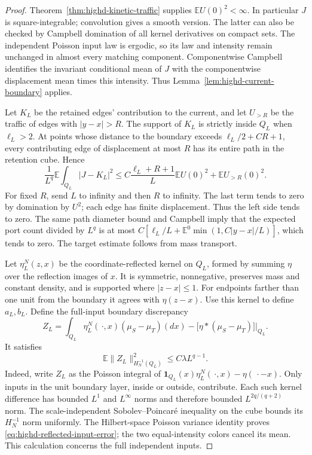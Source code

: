 \documentclass[11pt,reqno]{amsart}
\theoremstyle{definition}
\theoremstyle{remark}
\numberwithin{equation}{section}
\newcommand{\E}{\mathbb E}
\begin{document}
\begin{proof}
Theorem~\ref{thm:highd-kinetic-traffic} supplies \(\E U(0)^2<\infty\).
In particular \(J\) is square-integrable; convolution gives a smooth
version. The latter can also be checked by Campbell domination of all
kernel derivatives on compact sets. The independent Poisson input law
is ergodic, so its law and intensity remain unchanged in almost every
matching component. Componentwise Campbell identifies the invariant
conditional mean of \(J\) with the componentwise displacement mean
times this intensity. Thus Lemma~\ref{lem:highd-current-boundary} applies.

Let \(K_L\) be the retained edges' contribution to the current, and
let \(U_{>R}\) be the traffic of edges with \(|y-x|>R\).
The support of \(K_L\) is strictly inside \(Q_L\) when \(\ell_L>2\).
At points whose distance to the boundary exceeds
\(\ell_L/2+CR+1\), every contributing edge of displacement at most
\(R\) has its entire path in the retention cube. Hence
\begin{equation}
\label{eq:highd-bulk-current-error}
 \frac1{L^q}\E\int_{Q_L}|J-K_L|^2
 \le C\frac{\ell_L+R+1}{L}\E U(0)^2+\E U_{>R}(0)^2.
\end{equation}
For fixed \(R\), send \(L\) to infinity and then \(R\) to infinity.
The last term tends to zero by domination by \(U^2\); each edge has
finite displacement. Thus the left side tends to zero. The same path
diameter bound and Campbell imply that the expected port count divided
by \(L^q\) is at most
\(C[\ell_L/L+\E^0\min(1,C|y-x|/L)]\), which tends to zero.
The target estimate follows from mass transport.

Let \(\eta_L^N(z,x)\) be the coordinate-reflected kernel on \(Q_L\),
formed by summing \(\eta\) over the reflection images of \(x\).
It is symmetric, nonnegative, preserves mass and constant density, and
is supported where \(|z-x|\le1\). For endpoints farther than one
unit from the boundary it agrees with \(\eta(z-x)\). Use this kernel
to define \(a_L,b_L\). Define the full-input boundary discrepancy
\[
 Z_L=\int_{Q_L}\eta_L^N(\,\cdot,x)(\mu_S-\mu_T)(dx)
       -\bigl[\eta*(\mu_S-\mu_T)\bigr]\big|_{Q_L}.
\]
It satisfies
\begin{equation}
\label{eq:highd-reflected-input-error}
 \E\|Z_L\|_{H_N^{-1}(Q_L)}^2\le C\lambda L^{q-1}.
\end{equation}
Indeed, write \(Z_L\) as the Poisson integral of
\(\mathbf1_{Q_L}(x)\eta_L^N(\,\cdot,x)-\eta(\,\cdot-x)\).
Only inputs in the unit boundary layer, inside or outside, contribute.
Each such kernel difference has bounded \(L^1\) and \(L^\infty\)
norms and therefore bounded \(L^{2q/(q+2)}\) norm. The scale-independent
Sobolev--Poincar\'e inequality on the cube bounds its \(H_N^{-1}\) norm
uniformly. The Hilbert-space Poisson variance identity proves
\eqref{eq:highd-reflected-input-error}; the two equal-intensity colors
cancel its mean. This calculation concerns the full independent inputs.


\end{proof}
\end{document}
